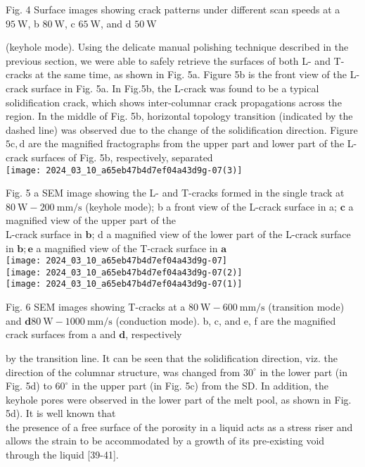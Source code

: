 \documentclass[10pt]{article}
\begin{document}
Fig. 4 Surface images showing crack patterns under different scan speeds at a $95 \mathrm{~W}$, b $80 \mathrm{~W}$, c $65 \mathrm{~W}$, and d $50 \mathrm{~W}$

(keyhole mode). Using the delicate manual polishing technique described in the previous section, we were able to safely retrieve the surfaces of both L- and T-cracks at the same time, as shown in Fig. 5a. Figure 5b is the front view of the L-crack surface in Fig. 5a. In Fig.5b, the L-crack was found to be a typical solidification crack, which shows inter-columnar crack propagations across the region. In the middle of Fig. 5b, horizontal topology transition (indicated by the dashed line) was observed due to the change of the solidification direction. Figure $5 \mathrm{c}, \mathrm{d}$ are the magnified fractographs from the upper part and lower part of the L-crack surfaces of Fig. 5b, respectively, separated\\
\texttt{[image: 2024\_03\_10\_a65eb47b4d7ef04a43d9g-07(3)]}

Fig. 5 a SEM image showing the L- and T-cracks formed in the single track at $80 \mathrm{~W}-200 \mathrm{~mm} / \mathrm{s}$ (keyhole mode); b a front view of the L-crack surface in a; $\mathbf{c}$ a magnified view of the upper part of the\\
L-crack surface in $\mathbf{b}$; d a magnified view of the lower part of the L-crack surface in $\mathbf{b} ; \mathbf{e}$ a magnified view of the T-crack surface in $\mathbf{a}$\\
\texttt{[image: 2024\_03\_10\_a65eb47b4d7ef04a43d9g-07]}\\
\texttt{[image: 2024\_03\_10\_a65eb47b4d7ef04a43d9g-07(2)]}\\
\texttt{[image: 2024\_03\_10\_a65eb47b4d7ef04a43d9g-07(1)]}

Fig. 6 SEM images showing T-cracks at a $80 \mathrm{~W}-600 \mathrm{~mm} / \mathrm{s}$ (transition mode) and $\mathbf{d} 80 \mathrm{~W}-1000 \mathrm{~mm} / \mathrm{s}$ (conduction mode). b, c, and e, f are the magnified crack surfaces from a and $\mathbf{d}$, respectively

by the transition line. It can be seen that the solidification direction, viz. the direction of the columnar structure, was changed from $30^{\circ}$ in the lower part (in Fig. 5d) to $60^{\circ}$ in the upper part (in Fig. 5c) from the SD. In addition, the keyhole pores were observed in the lower part of the melt pool, as shown in Fig. 5d). It is well known that\\
the presence of a free surface of the porosity in a liquid acts as a stress riser and allows the strain to be accommodated by a growth of its pre-existing void through the liquid [39-41].
\end{document}
